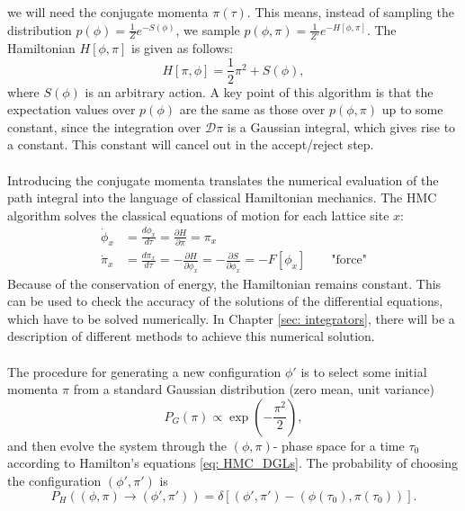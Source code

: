 we will need the conjugate momenta $\pi(\tau)$. This means, instead of sampling the distribution $p(\phi) = \frac{1}{Z} e^{-S(\phi)}$, we sample 
$p(\phi, \pi) = \frac{1}{Z'} e^{-H[\phi, \pi]}$. The Hamiltonian $H[\phi, \pi]$ is given as follows: 
\begin{equation}
    H[\pi, \phi] = \frac{1}{2}\pi^2 + S(\phi), 
\end{equation}
where $S(\phi)$ is an arbitrary action. A key point of this algorithm is that the expectation values over $p(\phi)$ are the same as those over $p(\phi, \pi)$ 
up to some constant, since the integration over $\mathcal{D} \pi$ is a Gaussian integral, which gives rise to a constant. This constant will cancel out in the 
accept/reject step. \\\\
Introducing the conjugate momenta translates the numerical evaluation of the path integral into the language of classical Hamiltonian mechanics. The HMC algorithm 
solves the classical equations of motion for each lattice site $x$: 
\begin{align}\label{eq: HMC_DGLs}
    \dot{\phi}_x &= \frac{d \phi_x}{d \tau} = \frac{\partial H}{\partial \pi} = \pi_x \\
    \dot{\pi}_x &= \frac{d \pi_x}{d \tau} = -\frac{\partial H}{\partial \phi_x} = -\frac{\partial S}{\partial \phi_x} = -F[\phi_x] \qquad \text{"force"}
\end{align}
Because of the conservation of energy, the Hamiltonian remains constant. This can be used to check the accuracy of the solutions of the differential equations, 
which have to be solved numerically. In Chapter \ref{sec: integrators}, there will be a description of different methods to achieve this numerical solution.\\\\
The procedure for generating a new configuration $\phi'$ is to select some initial momenta $\pi$ from a standard Gaussian distribution (zero mean, unit variance)
\begin{equation}
    P_G(\pi) \propto \exp \left( -\frac{\pi^2}{2}\right), 
\end{equation}
and then evolve the system through the $(\phi, \pi)$- phase space for a time $\tau_0$ according to Hamilton's equations \ref{eq: HMC_DGLs}. 
The probability of choosing the configuration $(\phi', \pi')$ is 
\begin{equation}
    P_H((\phi, \pi) \rightarrow (\phi', \pi')) = \delta \left[ (\phi', \pi') - (\phi(\tau_0), \pi(\tau_0)) \right]. 
\end{equation}
